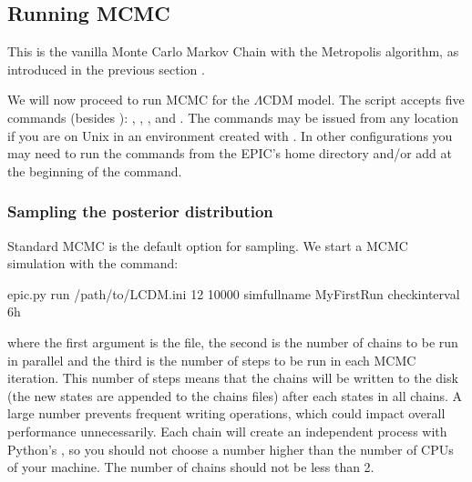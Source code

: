 \documentclass[letterpaper,12pt,english]{sphinxhowto}
\begin{document}
\subsection{Running MCMC}
\label{\detokenize{MCMC:running-mcmc}}\label{\detokenize{MCMC::doc}}
This is the vanilla Monte Carlo Markov Chain with the Metropolis algorithm, as
introduced in the previous section {\hyperref[\detokenize{intro:mh-sampler}]{}}.

We will now proceed to run MCMC for the \(\Lambda\text{CDM}\) model.
The  script accepts five commands (besides ): ,
, ,  and .
The commands may be issued from any location if you are on Unix in an
environment created with .
In other configurations you may need to run the commands from the EPIC’s home
directory and/or add  at the beginning of the command.


\subsubsection{Sampling the posterior distribution}
\label{\detokenize{MCMC:sampling-the-posterior-distribution}}
Standard MCMC is the default option for sampling.
We start a MCMC simulation with the  command:

%
\begin{sphinxVerbatim}[commandchars=\\\{\}]
\PYGZdl{} epic.py run /path/to/LCDM.ini 12 10000 \PYGZhy{}\PYGZhy{}sim\PYGZhy{}full\PYGZhy{}name MyFirstRun \PYGZhy{}\PYGZhy{}check\PYGZhy{}interval 6h
\end{sphinxVerbatim}

where the first argument is the  file, the second is the number of
chains to be run in parallel and the third is the number of steps to be run in
each MCMC iteration.
This number of steps means that the chains will be written to the disk (the new
states are appended to the chains files) after each  states in all
chains.
A large number prevents frequent writing operations, which could impact overall
performance unnecessarily.
Each chain will create an independent process with Python’s
, so you should not choose a
number higher than the number of CPUs  of your
machine.
The number of chains should not be less than 2.
\end{document}
